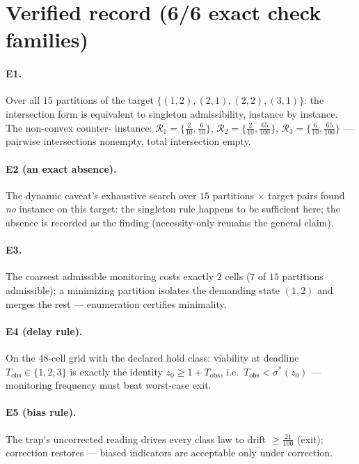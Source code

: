 \documentclass[10pt,twocolumn]{article}
\theoremstyle{definition}
\begin{document}
\section{Verified record (6/6 exact check families)}

\paragraph{E1.} Over all $15$ partitions of the target
$\{(1,2),(2,1),(2,2),(3,1)\}$: the intersection form is equivalent to
singleton admissibility, instance by instance. The non-convex counter-
instance: $\mathcal R_1=\{\tfrac2{10},\tfrac6{10}\}$,
$\mathcal R_2=\{\tfrac2{10},\tfrac{65}{100}\}$,
$\mathcal R_3=\{\tfrac6{10},\tfrac{65}{100}\}$ --- pairwise intersections
nonempty, total intersection empty.

\paragraph{E2 (an exact absence).} The dynamic caveat's exhaustive search
over $15$ partitions $\times$ target pairs found \emph{no} instance on
this target: the singleton rule happens to be sufficient here; the absence
is recorded as the finding (necessity-only remains the general claim).

\paragraph{E3.} The coarsest admissible monitoring costs exactly $2$ cells
($7$ of $15$ partitions admissible); a minimizing partition isolates the
demanding state $(1,2)$ and merges the rest --- enumeration certifies
minimality.

\paragraph{E4 (delay rule).} On the $48$-cell grid with the declared hold
class: viability at deadline $T_{\mathrm{obs}}\in\{1,2,3\}$ is exactly the
identity $z_0\ge1+T_{\mathrm{obs}}$, i.e.\ $T_{\mathrm{obs}}<\sigma^\ast
(z_0)$ --- monitoring frequency must beat worst-case exit.

\paragraph{E5 (bias rule).} The trap's uncorrected reading drives every
class law to drift $\ge\tfrac{21}{100}$ (exit); correction restores ---
biased indicators are acceptable only under correction.
\end{document}
